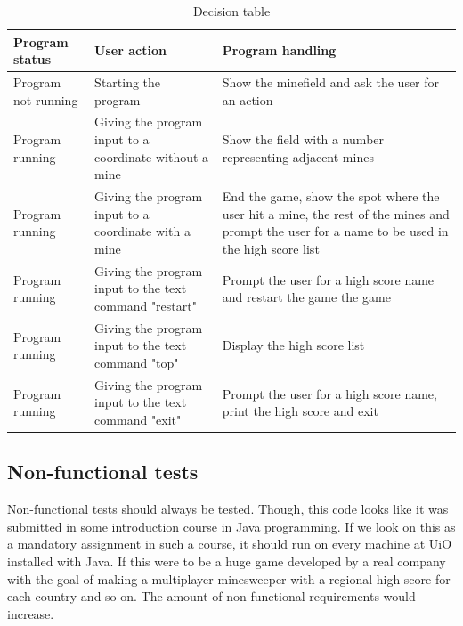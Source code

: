 \documentclass[UKenglish]{article}  %
\begin{document}
\begin{table}[H]
    \centering
    \caption{Decision table}
    \begin{tabular}{| m{1in} |  m{2in}  | m{3in} |}
        \hline
        \textbf{Program status} & \textbf{User action} & 
        \textbf{Program handling} \\ \hline

        Program not running & Starting the program & Show the minefield and ask
        the user for an action \\ \hline

        Program running & Giving the program input to a coordinate without a
        mine & Show the field with a number representing adjacent mines \\
        \hline

        Program running & Giving the program input to a coordinate with a mine &
        End the game, show the spot where the user hit a mine, the rest of the
        mines and prompt the user for a name to be used in the high score list
        \\ \hline

        Program running & Giving the program input to the text command "restart"
        & Prompt the user for a high score name and restart the game the game
        \\\hline

        Program running & Giving the program input to the text command "top" &
        Display the high score list \\\hline

        Program running & Giving the program input to the text command "exit" &
        Prompt the user for a high score name, print the high score and exit \\
        \hline
    \end{tabular}
\end{table}

\subsection{Non-functional tests}
Non-functional tests should always be tested. Though, this code looks like it
was submitted in some introduction course in Java programming. If we look on
this as a mandatory assignment in such a course, it should run on every machine
at UiO installed with Java. If this were to be a huge game developed by a real
company with the goal of making a multiplayer minesweeper with a regional
high score for each country and so on. The amount of non-functional requirements
would increase. 
\end{document}
